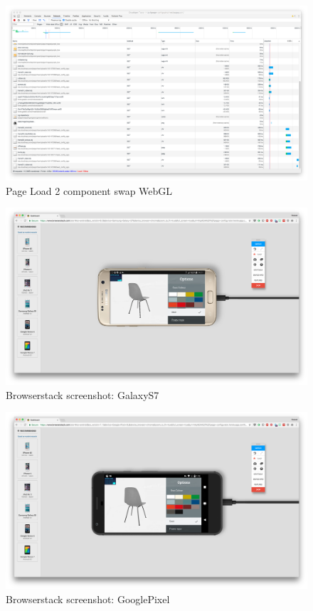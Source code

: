 \begin{figure}
\includegraphics[width=15cm]{images/2componentsSwapWebGL}
\caption{Page Load 2 component swap WebGL}
\label{attachment:2componentsSwapWebGL}
\end{figure}

\clearpage

\begin{figure}
\includegraphics[width=15cm]{images/deviceScreenshots/GalaxyS7}
\caption{Browserstack screenshot: GalaxyS7}
\label{attachment:GalaxyS7}
\end{figure}

\begin{figure}

\includegraphics[width=15cm]{images/deviceScreenshots/GooglePixel}
\caption{Browserstack screenshot: GooglePixel}
\label{attachment:GooglePixel}
\end{figure}


